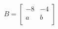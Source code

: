 \documentclass[preview]{standalone}
\begin{document}
\begin{align*}
B = \begin{bmatrix}
                        -8 & -4\\
                        a & b\\
                    \end{bmatrix}
\end{align*}
\end{document}
